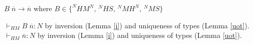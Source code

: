 \begin{case}
$B\;\overline{n}\rightarrow\overline{n}$ where $B\in\lbrace^{N}HM^{N},\,^{N}HS,\,^{N}MH^{N},\,^{N}MS\rbrace$

$\vdash_{HM}B\;\overline{n}:N$ by inversion (Lemma \ref{i}) and uniqueness of types (Lemma \ref{uot}).  $\vdash_{HM}\overline{n}:N$ by inversion (Lemma \ref{i}) and uniqueness of types (Lemma \ref{uot}).
\end{case}